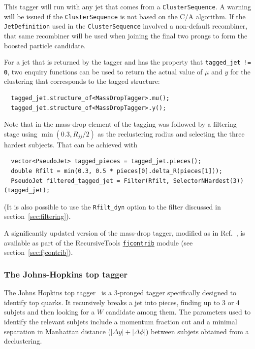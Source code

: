 \documentclass[12pt,a4]{article}
\newcommand{\fjcontrib}{\texttt{\href{http://fastjet.hepforge.org/contrib/}{fjcontrib}}\xspace}
\newcommand{\ttt}[1]{{\small\texttt{#1}}}
\newcommand{\CS}{\ttt{ClusterSequence}\xspace}
\begin{document}
%
This tagger will run with any jet that comes from a \CS. A warning
will be issued if the \CS is not based on the C/A algorithm.
%
If the \ttt{JetDefinition} used in the \CS involved a non-default
recombiner, that same recombiner will be used when joining the final
two prongs to form the boosted particle candidate.
%

For a jet that is returned by the tagger and has the property that
\ttt{tagged\_jet != 0}, two enquiry functions can be used to return
the actual value of $\mu$ and $y$ for the clustering that corresponds
to the tagged structure:
\begin{lstlisting}
  tagged_jet.structure_of<MassDropTagger>.mu();
  tagged_jet.structure_of<MassDropTagger>.y(); 
\end{lstlisting}

Note that in \cite{BDRS} the mass-drop element of the tagging was
followed by a filtering stage using $\min(0.3, R_{jj}/2)$ as the
reclustering radius and selecting the three hardest subjects. That can
be achieved with
\begin{lstlisting}
  vector<PseudoJet> tagged_pieces = tagged_jet.pieces();
  double Rfilt = min(0.3, 0.5 * pieces[0].delta_R(pieces[1]));
  PseudoJet filtered_tagged_jet = Filter(Rfilt, SelectorNHardest(3))(tagged_jet);
\end{lstlisting}
(It is also possible to use the \ttt{Rfilt\_dyn} option to the filter
discussed in section~\ref{sec:filtering}).

A significantly updated version of the mass-drop tagger, modified as
in Ref.~\cite{Dasgupta:2013ihk}, is available as part of the
RecursiveTools \fjcontrib module (see section~\ref{sec:fjcontrib}).

\subsubsection{The Johns-Hopkins top tagger}

The Johns Hopkins top tagger~\cite{Kaplan:2008ie} is a 3-pronged tagger
specifically designed to identify top quarks.
%
It recursively breaks a jet into pieces, finding up to 3 or 4 subjets
and then looking for a $W$ candidate among them.
%
The parameters used to identify the relevant subjets include a
momentum fraction cut and a minimal separation in Manhattan distance
($|\Delta y| + |\Delta \phi|$) between subjets obtained from a
declustering.
\end{document}
